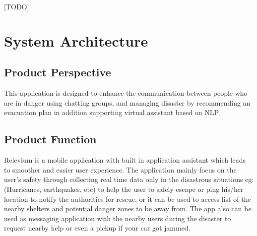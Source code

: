 \documentclass{scrreprt}
\begin{document}
[TODO]



\chapter{System Architecture}

\section{Product Perspective}

This application is designed to enhance the communication between people who are in danger using chatting groups, and managing disaster by recommending an evacuation plan in addition supporting virtual assistant based on NLP.

\section{Product Function}

Relevium is a mobile application with built in application assistant which leads to smoother and easier user experience. The application mainly focus on the user's safety through collecting real time data only in the disastrous situations eg: (Hurricanes, earthquakes, etc) to help the user to safely escape or ping his/her location to notify the  authorities for rescue, or it can be used to access list of the nearby shelters and potential danger zones to be away from. The app also can be used as messaging application with the nearby users during the disaster to request nearby help or even a pickup if your car got jammed.
\end{document}
